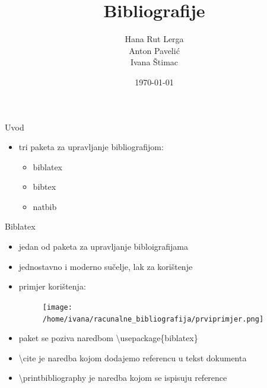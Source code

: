 \documentclass{beamer}
\begin{document}
\title{Bibliografije}
\date{\today}
\author{Hana Rut Lerga \\ Anton Pavelić \\ Ivana Štimac}

\begin{frame}
\maketitle
\end{frame}

\begin{frame}
\tableofcontents
\end{frame}


\begin{frame}{Uvod}
\begin{itemize}
	\item tri paketa za upravljanje bibliografijom:\\
	\begin{itemize}
		\item biblatex \\
		\item bibtex \\
		\item natbib \\
	\end{itemize}
\end{itemize}
	
\end{frame}

\begin{frame}{Biblatex}
\begin{itemize}
	\item jedan od paketa za upravljanje bibloigrafijama \\
	\item jednostavno i moderno sučelje, lak za korištenje \\
	\item primjer korištenja: \\
	\begin{figure}
	\texttt{[image: /home/ivana/racunalne\_bibliografija/prviprimjer.png]}
	\end{figure}
\end{itemize}
\end{frame}

\begin{frame}
\begin{itemize}
	\item paket se poziva naredbom \textbackslash usepackage\{biblatex\}\\
	\item \textbackslash cite je naredba kojom dodajemo referencu u tekst dokumenta \\
	\item \textbackslash printbibliography je naredba kojom se ispisuju reference \\
\end{itemize}
\end{frame}
\end{document}
